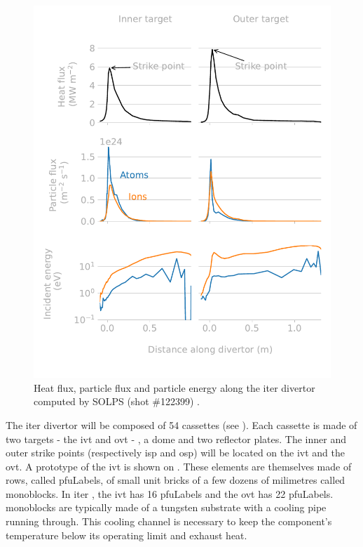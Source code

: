 \begin{figure} [h]
    \centering
    \includegraphics[width=\linewidth]{Figures/Chapter1/divertor_exposure_conditions.pdf}
    \caption{Heat flux, particle flux and particle energy along the \acrshort{iter} divertor computed by SOLPS (shot \#122399) \cite{pitts_physics_2019}.}
\end{figure}

The \acrshort{iter} divertor will be composed of 54 cassettes (see ).
Each cassette is made of two targets - the \gls{ivt} and \gls{ovt} - , a dome and two reflector plates.
The inner and outer \glspl{strike point} (respectively \acrshort{isp} and \acrshort{osp}) will be located on the \gls{ivt} and the \gls{ovt}.
A prototype of the \gls{ivt} is shown on .
These elements are themselves made of rows, called \glspl{pfuLabel}, of small unit bricks of a few dozens of milimetres called \glspl{monoblock}.
In \acrshort{iter} , the \gls{ivt} has 16 \glspl{pfuLabel} and the \gls{ovt} has 22 \glspl{pfuLabel}.
\Glspl{monoblock} are typically made of a tungsten substrate with a cooling pipe running through.
This cooling channel is necessary to keep the component's temperature below its operating limit and exhaust heat.

